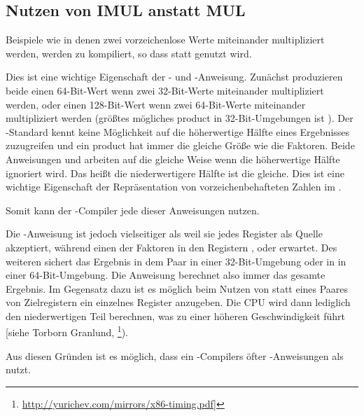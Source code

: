\subsection{Nutzen von IMUL anstatt MUL}
\label{IMUL_over_MUL}

Beispiele wie  in denen zwei vorzeichenlose Werte miteinander multipliziert
werden, werden zu  kompiliert, so dass \IMUL statt \MUL genutzt wird.

Dies ist eine wichtige Eigenschaft der \MUL- und \IMUL-Anweisung.
Zunächst produzieren beide einen 64-Bit-Wert wenn zwei 32-Bit-Werte miteinander multipliziert werden,
oder einen 128-Bit-Wert wenn zwei 64-Bit-Werte miteinander multipliziert werden (größtes mögliches \gls{product}
in 32-Bit-Umgebungen ist ).
Der \CCpp-Standard kennt keine Möglichkeit auf die höherwertige Hälfte eines Ergebnisses zuzugreifen
und ein \gls{product} hat immer die gleiche Größe wie die Faktoren. %
Beide Anweisungen \MUL und \IMUL arbeiten auf die gleiche Weise wenn die höherwertige Hälfte ignoriert wird.
Das heißt die niederwertigere Hälfte ist die gleiche.
Dies ist eine wichtige Eigenschaft der Repräsentation von vorzeichenbehafteten Zahlen im .

Somit kann der \CCpp-Compiler jede dieser Anweisungen nutzen.

Die \IMUL-Anweisung ist jedoch vielseitiger als \MUL weil sie jedes Register als Quelle akzeptiert,
während \MUL einen der Faktoren in den Registern \AX, \EAX oder \RAX erwartet.
Des weiteren sichert \MUL das Ergebnis in dem  Paar in einer 32-Bit-Umgebung oder
in  in einer 64-Bit-Umgebung. Die Anweisung berechnet also immer das gesamte Ergebnis.
Im Gegensatz dazu ist es möglich beim Nutzen von \IMUL statt eines Paares von Zielregistern ein
einzelnes Register anzugeben. Die \ac{CPU} wird dann lediglich den niederwertigen Teil berechnen,
was zu einer höheren Geschwindigkeit führt [siehe Torborn Granlund, \footnote{\url{http://yurichev.com/mirrors/x86-timing.pdf}]}).

Aus diesen Gründen ist es möglich, dass ein \CCpp-Compilers öfter \IMUL-Anweisungen als \MUL nutzt.

